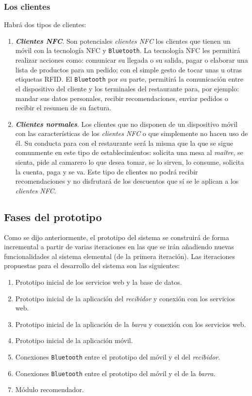     \subsubsection{Los clientes}
    \label{subsubsec:clients}
  Habrá dos tipos de clientes:
  \begin{enumerate}
  \item \emph{\textbf{Clientes \acs{NFC}}}. Son potenciales \emph{clientes
  \acs{NFC}} los clientes que tienen un móvil con la tecnología \acs{NFC} y
  \texttt{Bluetooth}. La tecnología \acs{NFC} les permitirá realizar acciones
  como: comunicar su llegada o su salida, pagar o elaborar una lista de
  productos para un pedido; con el simple gesto de tocar unas u otras
  etiquetas \acs{RFID}. El \texttt{Bluetooth} por su parte, permitirá la
  comunicación entre el dispositivo del cliente y los terminales del
  restaurante para, por ejemplo: mandar sus datos personales, recibir
  recomendaciones, enviar pedidos o recibir el resumen de su factura.
  \item \emph{\textbf{Clientes normales}}. Los clientes que no disponen
  de un dispositivo móvil con las características de los \emph{clientes
  \acs{NFC}} o que simplemente no hacen uso de él. Su conducta para con
  el restaurante será la misma que la que se sigue comunmente en este tipo
  de establecimientos: solicita una mesa al \emph{maître}, se sienta,
  pide al camarero lo que desea tomar, se lo sirven, lo consume, solicita
  la cuenta, paga y se va. Este tipo de clientes no podrá recibir
  recomendaciones y no disfrutará de los descuentos que sí se le aplican
  a los \emph{clientes \acs{NFC}}.
  \end{enumerate}

  \subsection{Fases del prototipo}
Como se dijo anteriormente, el prototipo del sistema se construirá de forma
incremental a partir de varias iteraciones en las que se irán añadiendo
nuevas funcionalidades al sistema elemental (de la primera iteración). Las
iteraciones propuestas para el desarrollo del sistema son las siguientes:
\begin{enumerate}
\item Prototipo inicial de los servicios web y la base de datos.
\item Prototipo inicial de la aplicación del \emph{recibidor} y conexión con 
los servicios web.
\item Prototipo inicial de la aplicación de la \emph{barra} y conexión con los 
servicios web.
\item Prototipo inicial de la aplicación móvil.
\item Conexiones \texttt{Bluetooth} entre el prototipo del móvil y el del
\emph{recibidor}.
\item Conexiones \texttt{Bluetooth} entre el prototipo del móvil y el de la
\emph{barra}.
\item Módulo recomendador.
\end{enumerate}

